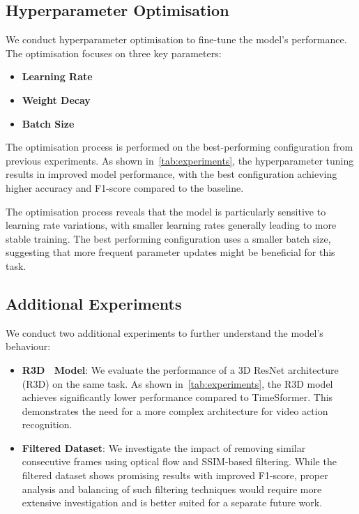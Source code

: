 \subsection{Hyperparameter Optimisation}

We conduct hyperparameter optimisation to fine-tune the model's performance. The optimisation focuses on three key parameters:

\begin{itemize}
    \item \textbf{Learning Rate}
    \item \textbf{Weight Decay}
    \item \textbf{Batch Size}
\end{itemize}

The optimisation process is performed on the best-performing configuration from previous experiments.
As shown in~\autoref{tab:experiments}, the hyperparameter tuning results in improved model performance, with the best configuration achieving higher accuracy and F1-score compared to the baseline.

The optimisation process reveals that the model is particularly sensitive to learning rate variations, with smaller learning rates generally leading to more stable training.
The best performing configuration uses a smaller batch size, suggesting that more frequent parameter updates might be beneficial for this task.

\subsection{Additional Experiments}

We conduct two additional experiments to further understand the model's behaviour:

\begin{itemize}
    \item \textbf{R3D~\cite{TODO} Model}: We evaluate the performance of a 3D ResNet architecture (R3D) on the same task.
     As shown in~\autoref{tab:experiments}, the R3D model achieves significantly lower performance compared to TimeSformer.
     This demonstrates the need for a more complex architecture for video action recognition.
    
    \item \textbf{Filtered Dataset}: We investigate the impact of removing similar consecutive frames using optical flow and SSIM-based filtering.
    While the filtered dataset shows promising results with improved F1-score, proper analysis and balancing of such filtering techniques would require more extensive investigation and is better suited for a separate future work.
\end{itemize}
